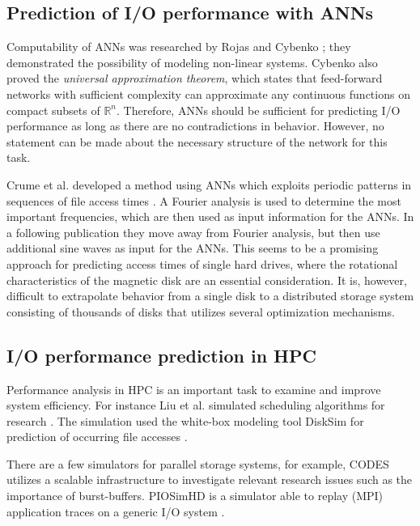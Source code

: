 \documentclass{superfri}
\begin{document}
	\subsection{Prediction of I/O performance with ANNs}
	Computability of ANNs was researched by Rojas \cite{Rojas:1996:NNS:235222} and Cybenko \cite{cybenko:mcss}; they demonstrated the  possibility of modeling non-linear systems. 
	Cybenko also proved the \textit{universal approximation theorem}, which states that feed-forward networks with sufficient complexity can approximate any continuous functions on compact subsets of $\mathbb{R}^n$.
	Therefore, ANNs should be sufficient for predicting I/O performance as long as there are no contradictions in behavior. 
	However, no statement can be made about the necessary structure of the network for this task.
	
	Crume et al. developed a method using ANNs which exploits periodic patterns in sequences of file access times \cite{Crume:2013:FML:2538542.2538561}.
	A Fourier analysis is used to determine the most important frequencies, which are then used as input information for the ANNs.
	In a following publication \cite{crumelatent} they move away from Fourier analysis, but then use additional sine waves as input for the ANNs.
	This seems to be a promising approach for predicting access times of single hard drives, where the rotational characteristics of the magnetic disk are an essential consideration. 
	It is, however, difficult to extrapolate behavior from a single disk to a distributed storage system consisting of thousands of disks that utilizes several optimization mechanisms.
	
	\subsection{I/O performance prediction in HPC}
	Performance analysis in HPC is an important task to examine and improve system efficiency.
	For instance Liu et al. simulated scheduling algorithms for research \cite{liu2011towards}. 
	The simulation used the white-box modeling tool DiskSim for prediction of occurring file accesses \cite{Bucy08thedisksim}.
	
	There are a few simulators for parallel storage systems, for example, CODES\,\cite{cope2011codes} utilizes a scalable infrastructure to investigate relevant research issues such as the importance of burst-buffers.
	PIOSimHD is a simulator able to replay (MPI) application traces on a generic I/O system \cite{kunkel2013simulating}.
	
\end{document}
